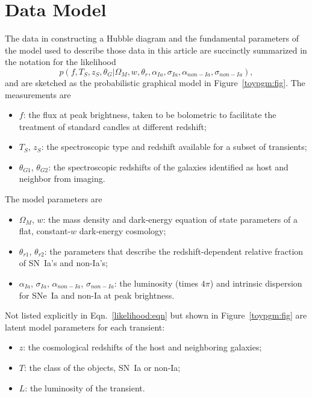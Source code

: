 \documentclass[preprint,3p]{elsarticle}
\begin{document}
\section{Data Model}
\label{model:sec}
The data in constructing a Hubble diagram and the fundamental parameters of the
model used to describe those data in this article are succinctly summarized in the notation
for the likelihood 
\begin{equation}
p(f, {{T}}_S,{{z}}_S, \theta_G|  \Omega_M, w, \theta_r,\alpha_{Ia},\sigma_{Ia}, \alpha_{\mathit{non-Ia}},\sigma_{\mathit{non-Ia}}),
\label{likelihood:eqn}
\end{equation}
and are sketched as the probabilistic graphical model in Figure~\ref{toypgm:fig}.
The measurements are
\begin{itemize}
\item $f$: the flux at peak brightness, taken 
to be bolometric to facilitate the treatment of
standard candles at different redshift;
\item ${{T}}_S$, ${{z}}_S$: the spectroscopic type and redshift available for a subset of transients;
\item $\theta_{G1}$, $\theta_{G2}$: the spectroscopic redshifts of the galaxies identified
as host and neighbor from imaging.
\end{itemize}
The model parameters are
\begin{itemize}
\item $\Omega_M$, $w$: the mass density and dark-energy equation of state parameters of a flat,
constant-$w$ dark-energy cosmology;
\item $\theta_{r1}$, $\theta_{r2}$:  the parameters
that describe the redshift-dependent relative fraction of SN~Ia's and non-Ia's;
\item $\alpha_{Ia}$, $\sigma_{Ia}$, $\alpha_{\mathit{non-Ia}}$, $\sigma_{\mathit{non-Ia}}$:
the luminosity (times $4\pi$) and intrinsic dispersion for SNe~Ia and non-Ia at peak brightness.
\end{itemize}
Not listed explicitly in Eqn.~\ref{likelihood:eqn} but shown in Figure~\ref{toypgm:fig} are latent model parameters for each transient:
\begin{itemize}
\item $z$: the cosmological redshifts of the host and neighboring galaxies;
\item $T$: the class of the objects, SN~Ia or non-Ia;
\item $L$: the luminosity of the transient.
\end{itemize}
\end{document}
